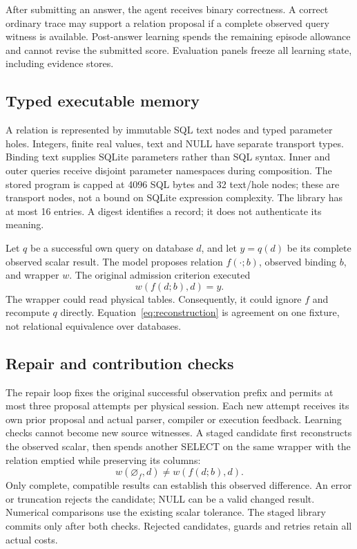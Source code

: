 \documentclass[10pt,twocolumn]{article}
\begin{document}
After submitting an answer, the agent receives binary correctness. A correct
ordinary trace may support a relation proposal if a complete observed query
witness is available. Post-answer learning spends the remaining episode
allowance and cannot revise the submitted score. Evaluation panels freeze all
learning state, including evidence stores.

\subsection{Typed executable memory}
A relation is represented by immutable SQL text nodes and typed parameter holes.
Integers, finite real values, text and NULL have separate transport types.
Binding text supplies SQLite parameters rather than SQL syntax. Inner and outer
queries receive disjoint parameter namespaces during composition. The stored
program is capped at 4096 SQL bytes and 32 text/hole nodes; these are transport
nodes, not a bound on SQLite expression complexity. The library has at most
16 entries. A digest identifies a record; it does not authenticate its meaning.

Let $q$ be a successful own query on database $d$, and let $y=q(d)$ be its
complete observed scalar result. The model proposes relation $f(\cdot;b)$,
observed binding $b$, and wrapper $w$. The original admission criterion executed
\begin{equation}\label{eq:reconstruction}
 w(f(d;b),d)=y.
\end{equation}
The wrapper could read physical tables. Consequently, it could ignore $f$ and
recompute $q$ directly. Equation~\eqref{eq:reconstruction} is agreement on one
fixture, not relational equivalence over databases.

\subsection{Repair and contribution checks}
The repair loop fixes the original successful observation prefix and permits
at most three proposal attempts per physical session. Each new attempt receives
its own prior proposal and actual parser, compiler or execution feedback.
Learning checks cannot become new source witnesses. A staged candidate first
reconstructs the observed scalar, then spends another SELECT on the same wrapper
with the relation emptied while preserving its columns:
\begin{equation}\label{eq:dependence}
 w(\varnothing_f,d)\ne w(f(d;b),d).
\end{equation}
Only complete, compatible results can establish this observed difference. An
error or truncation rejects the candidate; NULL can be a valid changed result.
Numerical comparisons use the existing scalar tolerance. The staged library
commits only after both checks. Rejected candidates, guards and retries retain
all actual costs.
\end{document}
